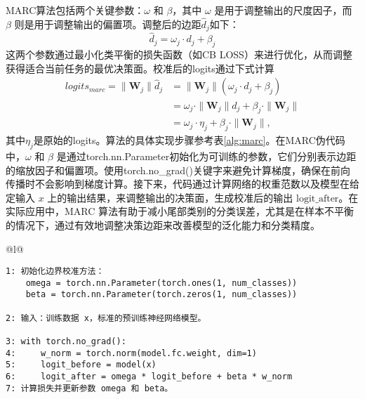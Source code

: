\documentclass[master]{thesis-uestc}
\begin{document}
MARC算法包括两个关键参数：$\omega$ 和 $\beta$，其中 $\omega$ 是用于调整输出的尺度因子，而 $\beta$ 则是用于调整输出的偏置项。调整后的边距$\hat{d}_j$如下：
\begin{equation}
    \hat{d}_j = \omega_j \cdot d_j + \beta_j
\end{equation}
这两个参数通过最小化类平衡的损失函数（如CB LOSS）来进行优化，从而调整获得适合当前任务的最优决策面。校准后的logits通过下式计算
\begin{equation}
    \begin{split}
    logits_{marc} = \| \mathbf{W}_j \| \hat{d}_j &= \| \mathbf{W}_j \| (\omega_j \cdot d_j + \beta_j) \\
    &= \omega_j \cdot \| \mathbf{W}_j \| d_j + \beta_j \cdot \| \mathbf{W}_j \| \\
    &= \omega_j \cdot \eta_j + \beta_j \cdot \| \mathbf{W}_j \|,
    \end{split}
\end{equation}
其中$\eta_j$是原始的logits。算法的具体实现步骤参考表\ref{alg:marc}。在MARC伪代码中，$\omega$ 和 $\beta$ 是通过torch.nn.Parameter初始化为可训练的参数，它们分别表示边距的缩放因子和偏置项。使用torch.no\_grad()关键字来避免计算梯度，确保在前向传播时不会影响到梯度计算。接下来，代码通过计算网络的权重范数以及模型在给定输入 $x$ 上的输出结果，来调整输出的决策面，生成校准后的输出 $\text{logit\_after}$。在实际应用中，MARC 算法有助于减小尾部类别的分类误差，尤其是在样本不平衡的情况下，通过有效地调整决策边距来改善模型的泛化能力和分类精度。

\begin{table}[h]
    \centering
    \begin{tabular}{@{}l@{}} %
    \toprule
     \\ %
    \midrule
    \begin{lstlisting}[basicstyle=\ttfamily,frame=none]
1: 初始化边界校准方法：
    omega = torch.nn.Parameter(torch.ones(1, num_classes))
    beta = torch.nn.Parameter(torch.zeros(1, num_classes))

2: 输入：训练数据 x，标准的预训练神经网络模型。

3: with torch.no_grad():
4:     w_norm = torch.norm(model.fc.weight, dim=1)
5:     logit_before = model(x)
6:     logit_after = omega * logit_before + beta * w_norm
7: 计算损失并更新参数 omega 和 beta。
    \end{lstlisting} \\
    \hline
    \end{tabular}
    \caption{MARC 算法的实现步骤}
    \label{alg:marc}
\end{table}
\end{document}
